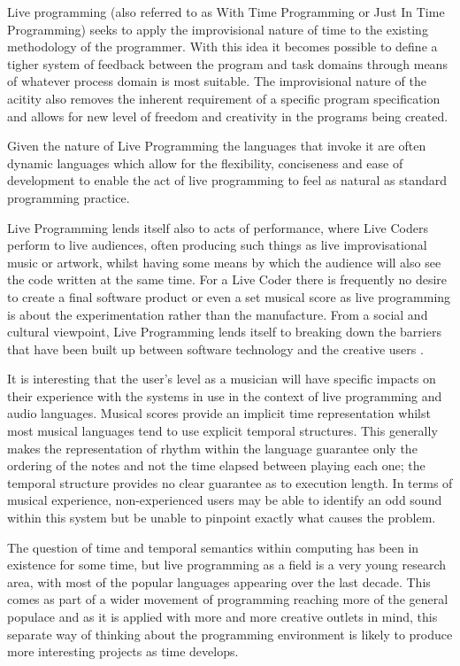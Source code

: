 \documentclass[11pt, abstracton, twoside]{scrartcl}
\begin{document}
Live programming (also referred to as With Time Programming or Just In Time 
Programming) seeks to apply the improvisional nature of time to the existing 
methodology of the programmer. With this idea it becomes possible to define a 
tigher system of feedback between the program and task domains through means 
of whatever process domain is most suitable. The improvisional nature of the 
acitity also removes the inherent requirement of a specific program 
specification and allows for new level of freedom and creativity in the 
programs being created. 

Given the nature of Live Programming the languages that invoke it are often 
dynamic languages which allow for the flexibility, conciseness and ease of 
development \cite{McD07} to enable the act of live programming to feel as 
natural as standard programming practice.

Live Programming lends itself also to acts of performance, where Live Coders 
perform to live audiences, often producing such things as live 
improvisational music or artwork, whilst having some means by which the 
audience will also see the code written at the same time. For a Live Coder 
there is frequently no desire to create a final software product or even a set 
musical score as live programming is about the experimentation rather than the 
manufacture. From a social and cultural viewpoint, Live Programming lends 
itself to breaking down the barriers that have been built up between software 
technology and the creative users \cite{McL13}.

It is interesting that the user's level as a musician will have specific 
impacts on their experience with the systems in use in the context of live 
programming and audio languages. Musical scores provide an implicit time 
representation whilst most musical languages tend to use explicit temporal 
structures. This generally makes the representation of rhythm within the 
language guarantee only the ordering of the notes and not the time elapsed 
between playing each one; the temporal structure provides no clear guarantee as 
to execution length. In terms of musical experience, non-experienced 
users may be able to identify an odd sound within this system but be unable to 
pinpoint exactly what causes the problem. 

The question of time and temporal semantics within computing has been in 
existence for some time, but live programming as a field is a very young 
research area, with most of the popular languages appearing over the last 
decade. This comes as part of a wider movement of programming reaching more of 
the general populace and as it is applied with more and more creative outlets 
in mind, this separate way of thinking about the programming environment is 
likely to produce more interesting projects as time develops. 
\end{document}
